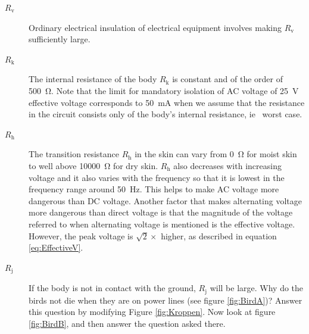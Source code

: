 \documentclass[../Elmag-labhefte-2020.tex]{subfiles}
\begin{document}
\begin{description}
    \item [$R_\text{v}$] Ordinary electrical insulation of electrical equipment involves making $R_\text{v}$ sufficiently large.
    
    
    \item [$R_\text{k}$] The internal resistance of the body $R_\text{k}$ is constant and of the order of \SI{500}{\ohm}. Note that the limit for mandatory isolation of AC voltage of \SI{25}{\V} effective voltage corresponds to \SI{50}{\milli\ampere} when we assume that the resistance in the circuit consists only of the body's internal resistance, ie \ worst case.
    \item [$R_\text{h}$] The transition resistance $R_\text{h}$ in the skin can vary from \SI{0}{\ohm} for moist skin to well above \SI{10000}{\ohm} for dry skin. $R_\text{h}$ also decreases with increasing voltage and it also varies with the frequency so that it is lowest in the frequency range around \SI{50}{\hertz}. This helps to make AC voltage more dangerous than DC voltage. Another factor that makes alternating voltage more dangerous than direct voltage is that the magnitude of the voltage referred to when alternating voltage is mentioned is the effective voltage. However, the peak voltage is $\sqrt{2} \times $ higher, as described in equation \eqref{eq:EffectiveV}.
    \item [$R_\text{j}$] If the body is not in contact with the ground, $R_\text{j}$ will be large. Why do the birds not die when they are on power lines (see figure \ref{fig:BirdA})? Answer this question by modifying Figure \ref{fig:Kroppen}. Now look at figure \ref{fig:BirdB}, and then answer the question asked there.
\end{description}
\end{document}

